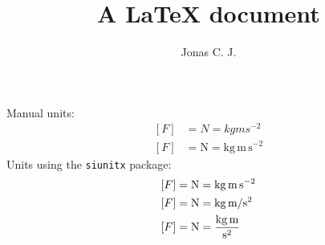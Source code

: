 \documentclass[a4paper, 12pt]{article}
\title{A \LaTeX{} document}
\author{Jonas C. J.}
\begin{document}
\noindent Manual units:
\begin{align*}
\left[F\right] &= N = kgms^{-2} \\
\left[F\right] &= \mathrm{N} = \mathrm{kg} \, \mathrm{m} \, \mathrm{s}^{-2}
\end{align*}
Units using the \verb!siunitx! package:
\begin{align*}
\left[F\right] &= \si{\newton} = \si{\kilogram\meter\per\second\squared} \\
\left[F\right] &= \si{\newton} = \si[per-mode=symbol]
{\kilogram\meter\per\second\squared} \\
\left[F\right] &= \si{\newton} = \si[per-mode=fraction]
{\kilogram\meter\per\second\squared}
\end{align*}
\end{document}
